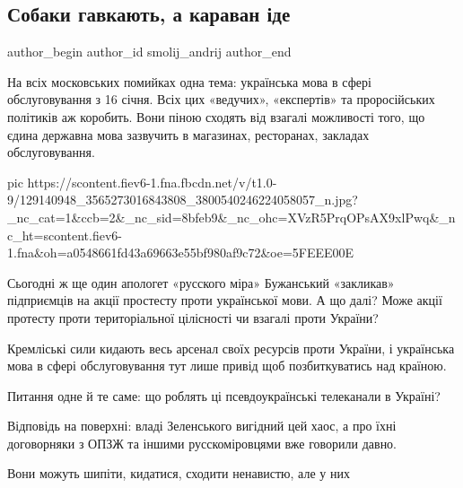 
 
 
 
 
 
\subsection{Собаки гавкають, а караван іде}
\label{sec:02_12_2020.fb.smolij_andrij.1.mova_karavan_ide}
\ifcmt
	author_begin
   author_id smolij_andrij
	author_end
\fi

На всіх московських помийках одна тема: українська мова в сфері обслуговування
з 16 січня. Всіх цих «ведучих», «експертів» та проросійських політиків аж
коробить. Вони піною сходять від взагалі можливості того, що єдина державна
мова зазвучить в магазинах, ресторанах, закладах обслуговування.

\ifcmt
pic https://scontent.fiev6-1.fna.fbcdn.net/v/t1.0-9/129140948_3565273016843808_3800540246224058057_n.jpg?_nc_cat=1&ccb=2&_nc_sid=8bfeb9&_nc_ohc=XVzR5PrqOPsAX9xlPwq&_nc_ht=scontent.fiev6-1.fna&oh=a0548661fd43a69663e55bf980af9c72&oe=5FEEE00E
\fi

Сьогодні ж ще один апологет «русского міра» Бужанський «закликав» підприємців
на акції простесту проти української мови. А що далі? Може акції протесту проти
територіальної цілісності чи взагалі проти України? 

Кремліські сили кидають весь арсенал своїх ресурсів проти України, і українська
мова в сфері обслуговування тут лише привід щоб позбиткуватись над країною.

Питання одне й те саме: що роблять ці псевдоукраїнські телеканали в Україні? 

Відповідь на поверхні: владі Зеленського вигідний цей хаос, а про їхні
договорняки з ОПЗЖ та іншими русскоміровцями вже говорили давно.

Вони 
можуть 
шипіти, кидатися, сходити ненавистю, 
але у них 

